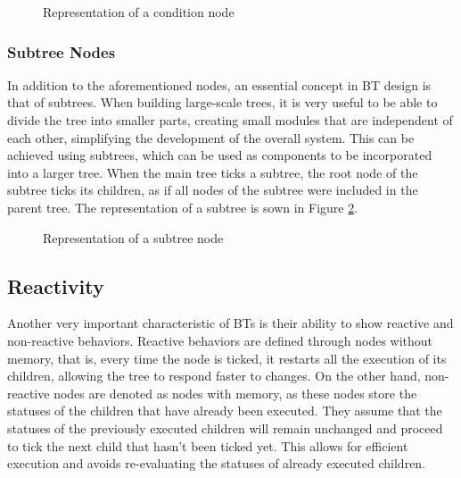 \begin{figure}[!h]
    \centering
    \scalebox{.9} {
        \begin{forest}
        \end{forest}
    }
    \caption{Representation of a condition node}
    \label{fig:background_condition_node}
\end{figure}

\subsubsection{Subtree Nodes}

In addition to the aforementioned nodes, an essential concept in BT design is that of subtrees. When building large-scale trees, it is very useful to be able to divide the tree into smaller parts, creating small modules that are independent of each other, simplifying the development of the overall system. This can be achieved using subtrees, which can be used as components to be incorporated into a larger tree. When the main tree ticks a subtree, the root node of the subtree ticks its children, as if all nodes of the subtree were included in the parent tree. The representation of a subtree is sown in Figure \ref{fig:background_subtree_node}.

\begin{figure}[!h]
    \centering
    \scalebox{.9} {
        \begin{forest}
        \end{forest}
    }
    \caption{Representation of a subtree node}
    \label{fig:background_subtree_node}
\end{figure}

\subsection{Reactivity}

Another very important characteristic of BTs is their ability to show reactive and non-reactive behaviors. Reactive behaviors are defined through nodes without memory, that is, every time the node is ticked, it restarts all the execution of its children, allowing the tree to respond faster to changes. On the other hand, non-reactive nodes are denoted as nodes with memory, as these nodes store the statuses of the children that have already been executed. They assume that the statuses of the previously executed children will remain unchanged and proceed to tick the next child that hasn't been ticked yet. This allows for efficient execution and avoids re-evaluating the statuses of already executed children.

